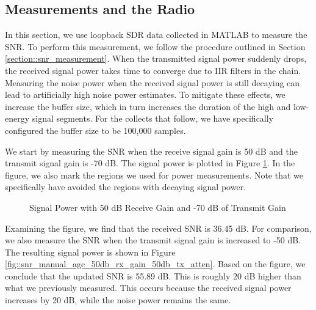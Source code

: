 \documentclass{article}
\begin{document}
\subsection{Measurements and the Radio}

In this section, we use loopback SDR data collected in MATLAB to measure the SNR. To perform this measurement, we follow the procedure outlined in Section \ref{section::snr_measurement}. When the transmitted signal power suddenly drops, the received signal power takes time to converge due to IIR filters in the chain. Measuring the noise power when the received signal power is still decaying can lead to artificially high noise power estimates. To mitigate these effects, we increase the buffer size, which in turn increases the duration of the high and low-energy signal segments. For the collects that follow, we have specifically configured the buffer size to be 100,000 samples.

We start by measuring the SNR when the receive signal gain is 50 dB and the transmit signal gain is -70 dB. The signal power is plotted in Figure \ref{fig::snr_manual_agc_50db_rx_gain_70db_tx_atten}. In the figure, we also mark the regions we used for power measurements. Note that we specifically have avoided the regions with decaying signal power.

\begin{figure}[H]
	\centerline{}
	\caption{Signal Power with 50 dB Receive Gain and -70 dB of Transmit Gain}
	\label{fig::snr_manual_agc_50db_rx_gain_70db_tx_atten}
\end{figure}

Examining the figure, we find that the received SNR is 36.45 dB. For comparison, we also measure the SNR when the transmit signal gain is increased to -50 dB. The resulting signal power is shown in Figure \ref{fig::snr_manual_agc_50db_rx_gain_50db_tx_atten}. Based on the figure, we conclude that the updated SNR is 55.89 dB. This is roughly 20 dB higher than what we previously measured. This occurs because the received signal power increases by 20 dB, while the noise power remains the same.
\end{document}
